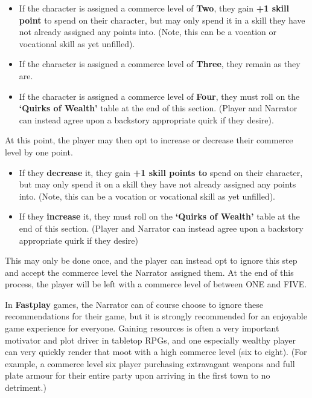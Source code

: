 \begin{itemize}
    \item If the character is assigned a commerce level of \textbf{Two}, they gain \textbf{+1 skill point} to spend on their character, but may only spend it in a skill they have not already assigned any points into. (Note, this can be a vocation or vocational skill as yet unfilled).
    \item If the character is assigned a commerce level of \textbf{Three}, they remain as they are.
    \item If the character is assigned a commerce level of \textbf{Four}, they must roll on the \textbf{‘Quirks of Wealth’} table at the end of this section. (Player and Narrator can instead agree upon a backstory appropriate quirk if they desire).
\end{itemize}

At this point, the player may then opt to increase or decrease their commerce level by one point.

\begin{itemize}
    \item If they \textbf{decrease} it, they gain \textbf{+1 skill points to} spend on their character, but may only spend it on a skill they have not already assigned any points into. (Note, this can be a vocation or vocational skill as yet unfilled).
    \item If they \textbf{increase} it, they must roll on the \textbf{‘Quirks of Wealth’} table at the end of this section. (Player and Narrator can instead agree upon a backstory appropriate quirk if they desire)
\end{itemize}

This may only be done once, and the player can instead opt to ignore this step and accept the commerce level the Narrator assigned them. At the end of this process, the player will be left with a commerce level of between ONE and FIVE.

In \textbf{Fastplay} games, the Narrator can of course choose to ignore these recommendations for their game, but it is strongly recommended for an enjoyable game experience for everyone. Gaining resources is often a very important motivator and plot driver in tabletop RPGs, and one especially wealthy player can very quickly render that moot with a high commerce level (six to eight). (For example, a commerce level six player purchasing extravagant weapons and full plate armour for their entire party upon arriving in the first town to no detriment.)


